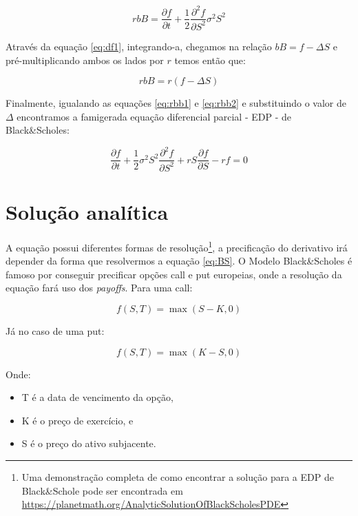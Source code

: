 \documentclass[]{book}
\providecommand{\tightlist}{%
  \setlength{\itemsep}{0pt}\setlength{\parskip}{0pt}}
\let\rmarkdownfootnote\footnote%
\def\footnote{\protect\rmarkdownfootnote}
\theoremstyle{definition}
\theoremstyle{definition}
\theoremstyle{definition}
\theoremstyle{remark}
\begin{document}
\begin{equation}
rbB = \frac{\partial f}{\partial t}+\frac{1}{2}\frac{\partial^2 f}{\partial S^2}\sigma^2S^2 
\label{eq:rbb1}
\end{equation}

Através da equação \eqref{eq:df1}, integrando-a, chegamos na relação \(bB = f - \Delta S\) e pré-multiplicando ambos os lados por \(r\) temos então que:

\begin{equation}
rbB = r(f-\Delta S) 
\label{eq:rbb2}
\end{equation}

Finalmente, igualando as equações \eqref{eq:rbb1} e \eqref{eq:rbb2} e substituindo o valor de \(\Delta\) encontramos a famigerada equação diferencial parcial - EDP - de Black\&Scholes:

\begin{equation}
\frac{\partial f}{\partial t}+\frac{1}{2}\sigma^2S^2\frac{\partial^2 f}{\partial S^2}+rS\frac{\partial f}{\partial S} - rf = 0
\label{eq:BS}
\end{equation}

\hypertarget{solucao-analitica}{%
\section{Solução analítica}\label{solucao-analitica}}

A equação possui diferentes formas de resolução\footnote{Uma demonstração completa de como encontrar a solução para a EDP de Black\&Schole pode ser encontrada em \url{https://planetmath.org/AnalyticSolutionOfBlackScholesPDE}}, a precificação do derivativo irá depender da forma que resolvermos a equação \eqref{eq:BS}. O Modelo Black\&Scholes é famoso por conseguir precificar opções call e put europeias, onde a resolução da equação fará uso dos \emph{payoffs}. Para uma call:

\begin{equation}
\displaystyle f(S,T)=\max(S-K,0)
\label{eq:cpayoff}
\end{equation}

Já no caso de uma put:

\begin{equation}
\displaystyle f(S,T)=\max(K-S,0)
\label{eq:ppayoff}
\end{equation}

Onde:

\begin{itemize}
\tightlist
\item
  T é a data de vencimento da opção,
\item
  K é o preço de exercício, e
\item
  S é o preço do ativo subjacente.
\end{itemize}
\end{document}
